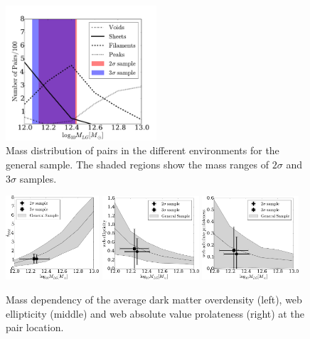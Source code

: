 \documentclass{emulateapj}
\begin{document}
\begin{figure}
\begin{center}
  \includegraphics[width=0.50\textwidth]{fig1.pdf}
\caption{Mass distribution of pairs in the different environments
for the general sample.
The shaded regions show the mass ranges of $2\sigma$ and $3\sigma$
samples.  
\label{fig:median_fraction}}
\end{center}
\end{figure}


\begin{figure}
\begin{center}
  \includegraphics[width=0.31\textwidth]{fig2a.pdf}
  \includegraphics[width=0.32\textwidth]{fig2b.pdf}
  \includegraphics[width=0.32\textwidth]{fig2c.pdf}
\caption{Mass dependency of the average dark matter overdensity (left),
  web ellipticity (middle) and web absolute value prolateness (right) at the
  pair location. 
\label{fig:median_overdensity}}
\end{center}
\end{figure}
\end{document}
